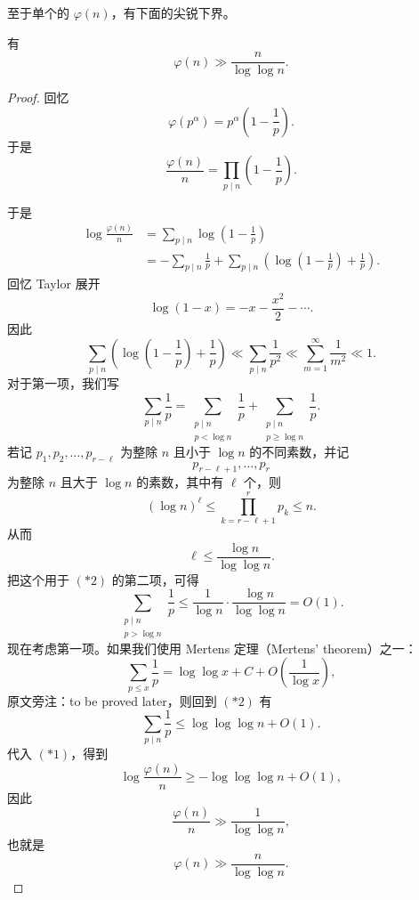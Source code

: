 至于单个的 $\varphi(n)$，有下面的尖锐下界。

\begin{theorem}[原文 Theorem 7]
	有
	\[
		\varphi(n)\gg \frac{n}{\log\log n}.
	\]
\end{theorem}

\begin{proof}
	回忆
	\[
		\varphi(p^\alpha)=p^\alpha\left(1-\frac1p\right).
	\]
	于是
	\[
		\frac{\varphi(n)}n
		=
		\prod_{p\mid n}\left(1-\frac1p\right).
	\]

	于是
	\begin{equation}
	\begin{aligned}
		\log\frac{\varphi(n)}n
		&=
		\sum_{p\mid n}\log\left(1-\frac1p\right) \\
		&=
		-\sum_{p\mid n}\frac1p
		+
		\sum_{p\mid n}
		\left(\log\left(1-\frac1p\right)+\frac1p\right).
	\end{aligned}
	\tag{*1}
	\end{equation}
	回忆 Taylor 展开
	\[
		\log(1-x)=-x-\frac{x^2}{2}-\cdots.
	\]
	因此
	\[
		\sum_{p\mid n}
		\left(\log\left(1-\frac1p\right)+\frac1p\right)
		\ll
		\sum_{p\mid n}\frac1{p^2}
		\ll
		\sum_{m=1}^\infty\frac1{m^2}
		\ll 1.
	\]
	对于第一项，我们写
	\begin{equation}
		\sum_{p\mid n}\frac1p
		=
		\sum_{\substack{p\mid n\\ p<\log n}}\frac1p
		+
		\sum_{\substack{p\mid n\\ p\geq \log n}}\frac1p.
	\tag{*2}
	\end{equation}
	若记 $p_1,p_2,\ldots,p_{r-\ell}$ 为整除 $n$ 且小于 $\log n$ 的不同素数，并记
	\[
		p_{r-\ell+1},\ldots,p_r
	\]
	为整除 $n$ 且大于 $\log n$ 的素数，其中有 $\ell$ 个，则
	\[
		(\log n)^\ell
		\leq
		\prod_{k=r-\ell+1}^r p_k
		\leq n.
	\]
	从而
	\[
		\ell\leq \frac{\log n}{\log\log n}.
	\]
	把这个用于 $(*2)$ 的第二项，可得
	\[
		\sum_{\substack{p\mid n\\ p>\log n}}\frac1p
		\leq
		\frac1{\log n}\cdot \frac{\log n}{\log\log n}
		=
		O(1).
	\]
	现在考虑第一项。如果我们使用 Mertens 定理（Mertens' theorem）之一：
	\[
		\sum_{p\leq x}\frac1p
		=
		\log\log x+C+O\left(\frac1{\log x}\right),
	\]
	原文旁注：to be proved later，则回到 $(*2)$ 有
	\[
		\sum_{p\mid n}\frac1p
		\leq
		\log\log\log n+O(1).
	\]
	代入 $(*1)$，得到
	\[
		\log\frac{\varphi(n)}n
		\geq
		-\log\log\log n+O(1),
	\]
	因此
	\[
		\frac{\varphi(n)}n\gg \frac1{\log\log n},
	\]
	也就是
	\[
		\varphi(n)\gg \frac{n}{\log\log n}.
	\]
\end{proof}

